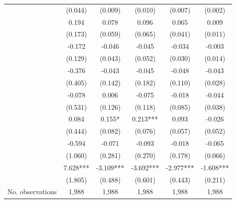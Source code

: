 \begin{table}
\begin{threeparttable}
\begin{tabular}{p{3cm}S@{}S@{}S@{}S@{}S@{}}
                                          &     {(0.044)}   &     {(0.009)}   &     {(0.010)}   &     {(0.007)}   &     {(0.002)}   \\
                       &       0.194   &       0.078   &       0.096   &       0.065   &       0.009   \\
                                          &     {(0.173)}   &     {(0.059)}   &     {(0.065)}   &     {(0.041)}   &     {(0.011)}   \\
            &      -0.172   &      -0.046   &      -0.045   &      -0.034   &      -0.003   \\
                                          &     {(0.129)}   &     {(0.043)}   &     {(0.052)}   &     {(0.030)}   &     {(0.014)}   \\
                &      -0.376   &      -0.043   &      -0.045   &      -0.048   &      -0.043   \\
                                          &     {(0.405)}   &     {(0.142)}   &     {(0.182)}   &     {(0.110)}   &     {(0.028)}   \\
                        &      -0.078   &       0.006   &      -0.075   &      -0.018   &      -0.044   \\
                                          &     {(0.531)}   &     {(0.126)}   &     {(0.118)}   &     {(0.085)}   &     {(0.038)}   \\
                     &       0.084   &       0.155*  &       0.213***&       0.093   &      -0.026   \\
                                          &     {(0.444)}   &     {(0.082)}   &     {(0.076)}   &     {(0.057)}   &     {(0.052)}   \\
                         &      -0.594   &      -0.071   &      -0.093   &      -0.018   &      -0.065   \\
                                          &     {(1.060)}   &     {(0.281)}   &     {(0.270)}   &     {(0.178)}   &     {(0.066)}   \\
                      &       7.628***&      -3.109***&      -3.692***&      -2.977***&      -1.608***\\
                                          &     {(1.805)}   &     {(0.488)}   &     {(0.601)}   &     {(0.443)}   &     {(0.211)}   \\
            \midrule
            No. observations              &       1,988   &       1,988   &       1,988   &       1,988   &       1,988   \\

\end{tabular}
\end{threeparttable}
\end{table}
